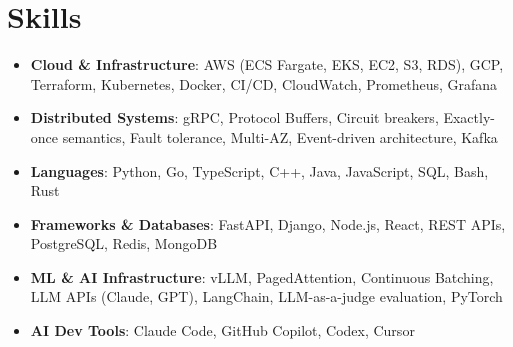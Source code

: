 \documentclass[letterpaper,11pt]{article}
\newcommand{\resumeSubHeadingListStart}{\begin{itemize}[leftmargin=0.15in, label={}]}
\newcommand{\resumeSubHeadingListEnd}{\end{itemize}}
\newcommand{\resumeSkillHeading}[2]{%
  \item\small{\textbf{#1}: #2 \vspace{-9pt}}%
}
\begin{document}
\section{Skills}
  \resumeSubHeadingListStart
    \resumeSkillHeading{Cloud \& Infrastructure}{AWS (ECS Fargate, EKS, EC2, S3, RDS), GCP, Terraform, Kubernetes, Docker, CI/CD, CloudWatch, Prometheus, Grafana}
    \resumeSkillHeading{Distributed Systems}{gRPC, Protocol Buffers, Circuit breakers, Exactly-once semantics, Fault tolerance, Multi-AZ, Event-driven architecture, Kafka}
    \resumeSkillHeading{Languages}{Python, Go, TypeScript, C++, Java, JavaScript, SQL, Bash, Rust}
    \resumeSkillHeading{Frameworks \& Databases}{FastAPI, Django, Node.js, React, REST APIs, PostgreSQL, Redis, MongoDB}
    \resumeSkillHeading{ML \& AI Infrastructure}{vLLM, PagedAttention, Continuous Batching, LLM APIs (Claude, GPT), LangChain, LLM-as-a-judge evaluation, PyTorch}
    \resumeSkillHeading{AI Dev Tools}{Claude Code, GitHub Copilot, Codex, Cursor}
  \resumeSubHeadingListEnd
\end{document}
